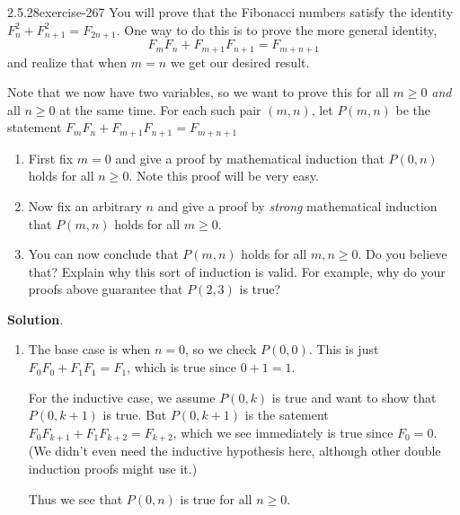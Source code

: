 \documentclass[twoside,11pt,]{book}
\numberwithin{equation}{chapter}
\begin{document}
\begin{divisionsolution}{2.5.28}{}{exercise-267}%
\hypertarget{p-3700}{}%
You will prove that the Fibonacci numbers satisfy the identity \(F_n^2 + F_{n+1}^2 = F_{2n+1}\). One way to do this is to prove the more general identity,%
\begin{equation*}
F_mF_n + F_{m+1}F_{n+1} = F_{m+n+1}
\end{equation*}
and realize that when \(m = n\) we get our desired result.%
\par
\hypertarget{p-3701}{}%
Note that we now have two variables, so we want to prove this for all \(m \ge 0\) \emph{and} all \(n \ge 0\) at the same time. For each such pair \((m,n)\), let \(P(m,n)\) be the statement \(F_mF_n + F_{m+1}F_{n+1} = F_{m+n+1}\)\leavevmode%
\begin{enumerate}[label=(\alph*)]
\item\hypertarget{li-1978}{}\hypertarget{p-3702}{}%
First fix \(m = 0\) and give a proof by mathematical induction that \(P(0,n)\) holds for all \(n \ge 0\). Note this proof will be very easy.%
\item\hypertarget{li-1979}{}\hypertarget{p-3703}{}%
Now fix an arbitrary \(n\) and give a proof by \emph{strong} mathematical induction that \(P(m,n)\) holds for all \(m \ge 0\).%
\item\hypertarget{li-1980}{}\hypertarget{p-3704}{}%
You can now conclude that \(P(m,n)\) holds for all \(m,n\ge 0\). Do you believe that? Explain why this sort of induction is valid. For example, why do your proofs above guarantee that \(P(2,3)\) is true?%
\end{enumerate}
%
\par\smallskip%
\noindent\textbf{Solution}.\quad%
\hypertarget{p-3705}{}%
\leavevmode%
\begin{enumerate}[label=(\alph*)]
\item\hypertarget{li-1981}{}\hypertarget{p-3706}{}%
The base case is when \(n = 0\), so we check \(P(0,0)\). This is just \(F_0F_0 + F_1F_1 = F_1\), which is true since \(0+1 = 1\).%
\par
\hypertarget{p-3707}{}%
For the inductive case, we assume \(P(0,k)\) is true and want to show that \(P(0,k+1)\) is true. But \(P(0,k+1)\) is the satement \(F_0F_{k+1} + F_{1}F_{k+2} = F_{k+2}\), which we see immediately is true since \(F_0 = 0\). (We didn't even need the inductive hypothesis here, although other double induction proofs might use it.)%
\par
\hypertarget{p-3708}{}%
Thus we see that \(P(0,n)\) is true for all \(n \ge 0\).%

\end{enumerate}
\end{divisionsolution}
\end{document}
